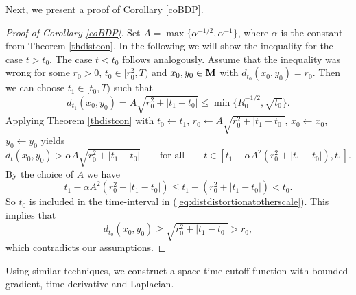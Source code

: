 \documentclass[11pt]{amsart}
\numberwithin{equation}{section}
\def\M{{\bf M}}
\numberwithin{equation}{section}
\begin{document}
Next, we present a proof of Corollary \ref{coBDP}.

\begin{proof}[Proof of Corollary \ref{coBDP}]
Set $A = \max \{ \alpha^{-1/2}, \alpha^{-1} \}$, where $\alpha$ is the constant from Theorem \ref{thdistcon}.
In the following we will show the inequality for the case $t > t_0$.
The case $t < t_0$ follows analogously.
Assume that the inequality was wrong for some $r_0 > 0$, $t_0 \in [r_0^2, T)$ and $x_0, y_0 \in \M$ with $d_{t_0} (x_0, y_0) = r_0$.
Then we can choose $t_1 \in [t_0, T)$ such that
\[ d_{t_1} (x_0, y_0) = A \sqrt{r_0^2 + | t_1 - t_0 |} \leq \min \{ R_0^{-1/2}, \sqrt{t_0} \}. \]
Applying Theorem \ref{thdistcon} with $t_0 \leftarrow t_1$, $r_0 \leftarrow A \sqrt{r_0^2 + |t_1 - t_0|}$, $x_0 \leftarrow x_0$, $y_0 \leftarrow y_0$ yields
\begin{equation} \label{eq:distdistortionatotherscale}
 d_t (x_0, y_0) > \alpha A \sqrt{r_0^2 + | t_1 - t_0 |} \qquad \text{for all} \qquad t \in [t_1 - \alpha A^2 (r_0^2 + |t_1 - t_0|), t_1].
\end{equation}
By the choice of $A$ we have
\[ t_1 - \alpha A^2 (r_0^2 + |t_1 - t_0| ) \leq t_1 - (r_0^2 + |t_1 - t_0| ) < t_0. \]
So $t_0$ is included in the time-interval in (\ref{eq:distdistortionatotherscale}).
This implies that
\[ d_{t_0} (x_0, y_0) \geq \sqrt{r_0^2 + |t_1 - t_0|} > r_0, \]
which contradicts our assumptions.
\end{proof}

Using similar techniques, we construct a space-time cutoff function with bounded gradient, time-derivative and Laplacian.
\end{document}
